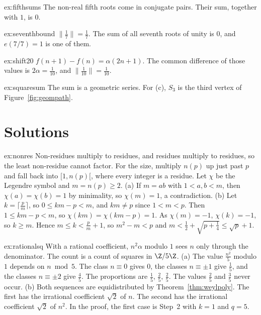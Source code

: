 \begin{hint}{ex:fifthsums}
The non-real fifth roots come in conjugate pairs. Their sum, together with $1$, is $0$.
\end{hint}
\begin{hint}{ex:seventhbound}
$\bigl\|\frac17\bigr\|=\frac17$. The sum of all seventh roots of unity is $0$, and $e(7/7)=1$ is one of them.
\end{hint}
\begin{hint}{ex:shift20}
$f(n+1)-f(n)=\alpha(2n+1)$. The common difference of those values is $2\alpha=\frac1{10}$, and $\bigl\|\frac1{10}\bigr\|=\frac1{10}$.
\end{hint}
\begin{hint}{ex:squaresum}
The sum is a geometric series. For (c), $S_3$ is the third vertex of Figure~\ref{fig:geompath}.
\end{hint}

\section{Solutions}

\begin{solution}{ex:nonres}
\idea Non-residues multiply to residues, and residues multiply to residues, so the least non-residue cannot factor. For the size, multiply $n(p)$ up just past $p$ and fall back into $[1,n(p)[$, where every integer is a residue.
\writeup Let $\chi$ be the Legendre symbol and $m=n(p)\ge2$. (a) If $m=ab$ with $1<a,b<m$, then $\chi(a)=\chi(b)=1$ by minimality, so $\chi(m)=1$, a contradiction. (b) Let $k=\lceil\frac pm\rceil$, so $0\le km-p<m$, and
$km\ne p$ since $1<m<p$. Then $1\le km-p<m$, so $\chi(km)=\chi(km-p)=1$. As $\chi(m)=-1$, $\chi(k)=-1$, so $k\ge m$. Hence $m\le k<\frac pm+1$, so $m^2-m<p$ and $m<\frac12+\sqrt{p+\frac14}\le\sqrt p+1$.
\end{solution}

\begin{solution}{ex:rationalsq}
\idea With a rational coefficient, $n^2\alpha$ modulo $1$ sees $n$ only through the denominator. The count is a count of squares in $\Z/5\Z$.
\writeup (a) The value $\frac{n^2}5$ modulo $1$ depends on $n\bmod5$. The class $n\equiv0$ gives $0$, the classes $n\equiv\pm1$ give $\frac15$, and the classes $n\equiv\pm2$ give $\frac45$. The proportions are $\frac15$, $\frac25$, $\frac25$. The values $\frac25$ and $\frac35$ never occur.
(b) Both sequences are equidistributed by Theorem~\ref{thm:weylpoly}. The first has the irrational coefficient $\sqrt2$ of $n$. The second has the irrational coefficient $\sqrt2$ of $n^2$. In the proof, the first case is Step~2 with $k=1$ and $q=5$.
\end{solution}

